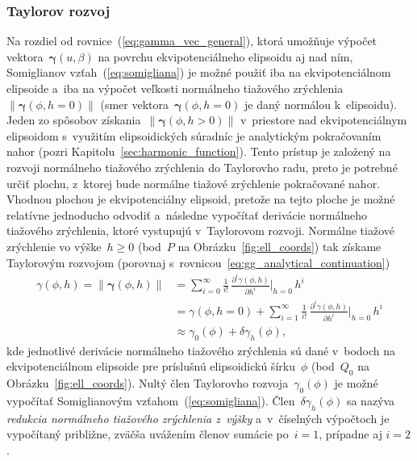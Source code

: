 \documentclass[a4paper, 12pt]{book}
\begin{document}
\subsubsection{Taylorov rozvoj}
\label{sec:normal_gravity_taylor_expansion}

Na rozdiel od rovnice~(\ref{eq:gamma_vec_general}), ktorá umožňuje výpočet 
vektora~$\boldsymbol \gamma(u, \beta)$ na povrchu ekvipotenciálneho elipsoidu 
aj nad ním, Somiglianov vzťah~(\ref{eq:somigliana}) je možné použiť iba na 
ekvipotenciálnom elipsoide a~iba na výpočet veľkosti normálneho tiažového 
zrýchlenia~$\| \boldsymbol \gamma(\phi, h = 0) \|$ (smer vektora~$\boldsymbol 
\gamma(\phi, h = 0)$ je daný normálou k~elipsoidu).  Jeden zo spôsobov 
získania~$\| \boldsymbol \gamma(\phi, h > 0) \|$ v~priestore nad 
ekvipotenciálnym elipsoidom s~využitím elipsoidických súradníc je analytickým 
pokračovaním nahor (pozri Kapitolu~\ref{sec:harmonic_function}).  Tento prístup 
je založený na rozvoji normálneho tiažového zrýchlenia do Taylorovho radu, 
preto je potrebné určiť plochu, z~ktorej bude normálne tiažové zrýchlenie 
pokračované nahor.  Vhodnou plochou je ekvipotenciálny elipsoid, pretože na 
tejto ploche je možné relatívne jednoducho odvodiť a~následne vypočítať 
derivácie normálneho tiažového zrýchlenia, ktoré vystupujú v~Taylorovom 
rozvoji.  Normálne tiažové zrýchlenie vo výške~$h \geq 0$ (bod~$P$ na 
Obrázku~\ref{fig:ell_coords}) tak získame Taylorovým rozvojom (porovnaj 
s~rovnicou~\ref{eq:gg_analytical_continuation})
%
\begin{equation}
\label{eq:gamma_taylor}
\begin{split}
\gamma(\phi, h) = \| \boldsymbol \gamma(\phi, h) \| &= \sum_{i = 0}^{\infty} 
\frac{1}{i!} \, \frac{\partial^i \gamma(\phi, h)}{\partial h^i} \bigg\lvert_{h 
= 0} \, h^i\\
%
&= \gamma(\phi, h = 0) + \sum_{i = 1}^{\infty} \frac{1}{i!} \, \frac{\partial^i 
\gamma(\phi, h)}{\partial h^i} \bigg\lvert_{h = 0} \, h^i\\
%
&\approx \gamma_0(\phi) + \delta\gamma_h(\phi){,}
\end{split}
\end{equation}
%
kde jednotlivé derivácie normálneho tiažového zrýchlenia sú dané v~bodoch na 
ekvipotenciálnom elipsoide pre príslušnú elipsoidickú šírku~$\phi$ (bod~$Q_0$ 
na Obrázku~\ref{fig:ell_coords}).  Nultý člen Taylorovho 
rozvoja~$\gamma_0(\phi)$ je možné vypočítať Somiglianovým 
vzťahom~(\ref{eq:somigliana}).  Člen~$\delta\gamma_h(\phi)$ sa nazýva 
\emph{redukcia normálneho tiažového zrýchlenia z~výšky} a~v~číselných výpočtoch 
je vypočítaný približne, zväčša uvážením členov sumácie po~$i = 1$, prípadne aj 
$i = 2$.
\end{document}
